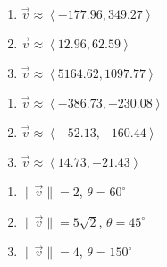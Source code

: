 \begin{multicols}{3}

\begin{enumerate}

\setcounter{enumi}{\value{HW}}

\item $\vec{v} \approx \left<-177.96, 349.27\right>$
\item $\vec{v} \approx \left<12.96, 62.59\right>$
\item $\vec{v} \approx \left<5164.62, 1097.77\right>$

\setcounter{HW}{\value{enumi}}

\end{enumerate}

\end{multicols}

\begin{multicols}{3}

\begin{enumerate}

\setcounter{enumi}{\value{HW}}

\item $\vec{v} \approx \left<-386.73, -230.08\right>$
\item $\vec{v} \approx \left<-52.13, -160.44\right>$
\item $\vec{v} \approx \left<14.73, -21.43\right>$

\setcounter{HW}{\value{enumi}}

\end{enumerate}

\end{multicols}

\begin{multicols}{3}

\begin{enumerate}

\setcounter{enumi}{\value{HW}}

\item  $\|\vec{v}\| = 2$, $\theta = 60^{\circ}$
\item $\|\vec{v}\| = 5\sqrt{2}$, $\theta = 45^{\circ}$
\item $\|\vec{v}\| = 4$, $\theta = 150^{\circ}$

\setcounter{HW}{\value{enumi}}

\end{enumerate}

\end{multicols}

